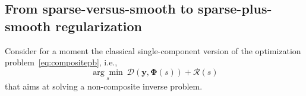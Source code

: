 \documentclass[12pt]{article}
\begin{document}


    
    \subsection{From sparse-versus-smooth to sparse-plus-smooth regularization}
    \label{sec:regularizationblabla}

    Consider for a moment the classical single-component version of the optimization problem~\eqref{eq:compositepb}, i.e.,
    \begin{equation} \label{eq:singletpb}
        \underset{s}{\arg\min} \ \mathcal{D}(\bm{y}, \bm{\Phi}(s)) + \mathcal{R} (s)
    \end{equation}
    that aims at solving a non-composite inverse problem.
\end{document}
